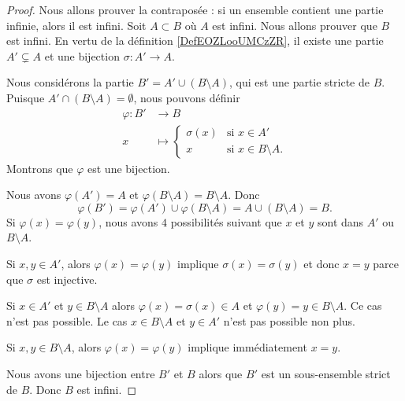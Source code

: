 \begin{proof}
	Nous allons prouver la contraposée : si un ensemble contient une partie infinie, alors il est infini. Soit \( A\subset B\) où \( A\) est infini. Nous allons prouver que \( B\) est infini. En vertu de la définition \ref{DefEOZLooUMCzZR}, il existe une partie \( A'\subsetneq A\) et une bijection \( \sigma\colon A'\to A\).

	Nous considérons la partie \( B'=A'\cup(B\setminus A)\), qui est une partie stricte de \( B\). Puisque \( A'\cap (B\setminus A)=\emptyset\), nous pouvons définir
	\begin{equation}
		\begin{aligned}
			\varphi\colon B' & \to B                                             \\
			x                & \mapsto \begin{cases}
				                           \sigma(x) & \text{si } x\in A'            \\
				                           x         & \text{si } x\in B\setminus A.
			                           \end{cases}
		\end{aligned}
	\end{equation}
	Montrons que \( \varphi\) est une bijection.
	\begin{subproof}
		\spitem[Surjectif]
		Nous avons \( \varphi(A')=A\) et \( \varphi(B\setminus A)=B\setminus A\). Donc
		\begin{equation}
			\varphi(B')=\varphi(A')\cup\varphi(B\setminus A)=A\cup (B\setminus A)=B.
		\end{equation}
		\spitem[Injectif]
		Si \( \varphi(x)=\varphi(y)\), nous avons \( 4\) possibilités suivant que \( x\) et \( y\) sont dans \( A'\) ou \( B\setminus A\).

		Si \( x,y\in A'\), alors \( \varphi(x)=\varphi(y)\) implique \( \sigma(x)=\sigma(y)\) et donc \( x=y\) parce que \( \sigma\) est injective.

		Si \( x\in A'\) et \( y\in B\setminus A\) alors \( \varphi(x)=\sigma(x)\in A\) et \( \varphi(y)=y\in B\setminus A\). Ce cas n'est pas possible. Le cas \( x\in B\setminus A\) et \( y\in A'\) n'est pas possible non plus.

		Si \( x,y\in B\setminus A\), alors \( \varphi(x)=\varphi(y)\) implique immédiatement \( x=y\).
	\end{subproof}
	Nous avons une bijection entre \( B'\) et \( B\) alors que \( B'\) est un sous-ensemble strict de \( B\). Donc \( B\) est infini.
\end{proof}




